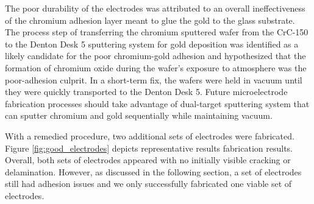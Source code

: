 \par The poor durability of the electrodes was attributed to an overall ineffectiveness of the chromium adhesion layer meant to glue the gold to the glass substrate. The process step of transferring the chromium sputtered wafer from the CrC-150 to the Denton Desk 5 sputtering system for gold deposition was identified as a likely candidate for the poor chromium-gold adhesion and hypothesized that the formation of chromium oxide during the wafer's exposure to atmosphere was the poor-adhesion culprit. In a short-term fix, the wafers were held in vacuum until they were quickly transported to the Denton Desk 5. Future microelectrode fabrication processes should take advantage of dual-target sputtering system that can sputter chromium and gold sequentially while maintaining vacuum.  

\par With a remedied procedure, two additional sets of electrodes were fabricated. Figure \ref{fig:good_electrodes} depicts representative results fabrication results. Overall, both sets of electrodes appeared with no initially visible cracking or delamination. However, as discussed in the following section, a set of electrodes still had adhesion issues and we only successfully fabricated one viable set of electrodes.

